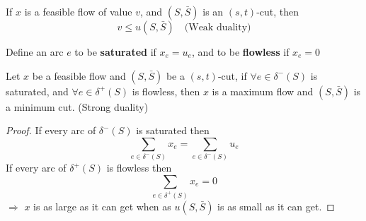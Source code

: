 
				\begin{corollary}
					If $x$ is a feasible flow of value $v$, and $(S, \bar{S})$ is an $(s, t)$-cut, then
					\begin{equation}
						v \le u(S, \bar{S}) \quad \text{(Weak duality)}
					\end{equation}
				\end{corollary}

				\begin{definition}
					Define an arc $e$ to be \textbf{saturated} if $x_e = u_e$, and to be \textbf{flowless} if $x_e = 0$
				\end{definition}

				\begin{corollary}
					Let $x$ be a feasible flow and $(S, \bar{S})$ be a $(s, t)$-cut, if $\forall e\in \delta^-(S)$ is saturated, and $\forall e\in \delta^+(S)$ is flowless, then $x$ is a maximum flow and $(S, \bar{S})$ is a minimum cut. (Strong duality)
				\end{corollary}

				\begin{proof}
					If every arc of $\delta^-(S)$ is saturated then
					\begin{equation}
						\sum_{e\in \delta^-(S)}x_e = \sum_{e\in \delta^-(S)}u_e
					\end{equation}
					If every arc of $\delta^+(S)$ is flowless then
					\begin{equation}
						\sum_{e\in \delta^+(S)}x_e = 0
					\end{equation}
					$\Rightarrow$ $x$ is as large as it can get when as $u(S, \bar{S})$ is as small as it can get.
				\end{proof}

